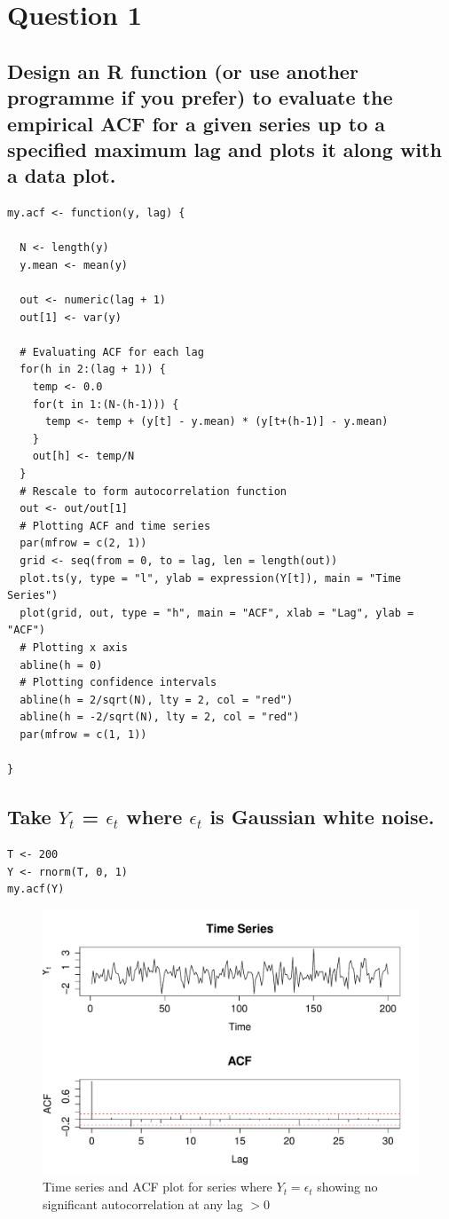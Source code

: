 \documentclass[10pt,a4paper]{article}
\let\Oldsubsection\subsection
\renewcommand{\subsection}{\FloatBarrier\Oldsubsection}
\begin{document}
\section{Question 1}
\subsection{Design an R function (or use another programme if you prefer) to evaluate the
empirical ACF for a given series up to a specified maximum lag and plots it along
with a data plot.}


\begin{lstlisting}
my.acf <- function(y, lag) {
  
  N <- length(y)
  y.mean <- mean(y)
  
  out <- numeric(lag + 1)
  out[1] <- var(y)
  
  # Evaluating ACF for each lag
  for(h in 2:(lag + 1)) {
    temp <- 0.0
    for(t in 1:(N-(h-1))) {
      temp <- temp + (y[t] - y.mean) * (y[t+(h-1)] - y.mean)
    }
    out[h] <- temp/N
  }
  # Rescale to form autocorrelation function
  out <- out/out[1]
  # Plotting ACF and time series
  par(mfrow = c(2, 1))
  grid <- seq(from = 0, to = lag, len = length(out))
  plot.ts(y, type = "l", ylab = expression(Y[t]), main = "Time Series")
  plot(grid, out, type = "h", main = "ACF", xlab = "Lag", ylab = "ACF")
  # Plotting x axis
  abline(h = 0)
  # Plotting confidence intervals
  abline(h = 2/sqrt(N), lty = 2, col = "red")
  abline(h = -2/sqrt(N), lty = 2, col = "red")
  par(mfrow = c(1, 1))
  
}
\end{lstlisting}


\subsection{Take $Y_t$ = $\epsilon_t$ where $\epsilon_t$
is Gaussian white noise.}
\begin{lstlisting}
T <- 200
Y <- rnorm(T, 0, 1)
my.acf(Y)
\end{lstlisting}


\begin{figure}[ht]
\includegraphics[width=\linewidth]{plots/p2.pdf}
\caption{Time series and ACF plot for series where $Y_t = \epsilon_t$ showing no significant autocorrelation at any lag $>0$}
\end{figure}
\end{document}
